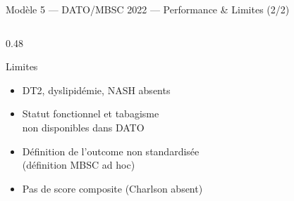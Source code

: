 \documentclass[aspectratio=169]{beamer}
\begin{document}
\begin{frame}{Modèle 5 --- DATO/MBSC 2022 --- Performance \& Limites (2/2)}
\begin{columns}[T]
\begin{column}{0.48\textwidth}
\begin{alertblock}{Limites}
\begin{itemize}
          \item DT2, dyslipidémie, NASH absents
          \item Statut fonctionnel et tabagisme\\
                non disponibles dans DATO
          \item Définition de l'outcome non standardisée\\
                (définition MBSC ad hoc)
          \item Pas de score composite (Charlson absent)
        \end{itemize}
      \end{alertblock}
    \end{column}
  \end{columns}
\end{frame}
\end{document}
